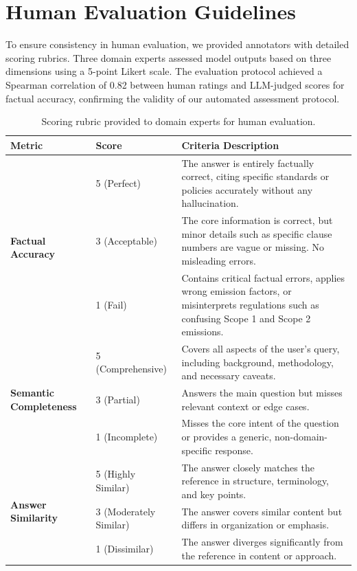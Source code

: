 \documentclass[]{interact}
\theoremstyle{plain}%
\theoremstyle{definition}
\theoremstyle{remark}
\begin{document}
\section{Human Evaluation Guidelines}\label{secA5}

To ensure consistency in human evaluation, we provided annotators with detailed scoring rubrics. Three domain experts assessed model outputs based on three dimensions using a 5-point Likert scale. The evaluation protocol achieved a Spearman correlation of 0.82 between human ratings and LLM-judged scores for factual accuracy, confirming the validity of our automated assessment protocol.

\begin{table}[h]
\centering
\caption{Scoring rubric provided to domain experts for human evaluation.}
\small
\begin{tabularx}{\linewidth}{l l >{\raggedright\arraybackslash}X}
\toprule
\textbf{Metric} & \textbf{Score} & \textbf{Criteria Description} \\
\midrule
\multirow{3}{*}{\textbf{Factual Accuracy}} 
& 5 (Perfect) & The answer is entirely factually correct, citing specific standards or policies accurately without any hallucination. \\
& 3 (Acceptable) & The core information is correct, but minor details such as specific clause numbers are vague or missing. No misleading errors. \\
& 1 (Fail) & Contains critical factual errors, applies wrong emission factors, or misinterprets regulations such as confusing Scope 1 and Scope 2 emissions. \\
\midrule
\multirow{3}{*}{\textbf{Semantic Completeness}} 
& 5 (Comprehensive) & Covers all aspects of the user's query, including background, methodology, and necessary caveats. \\
& 3 (Partial) & Answers the main question but misses relevant context or edge cases. \\
& 1 (Incomplete) & Misses the core intent of the question or provides a generic, non-domain-specific response. \\
\midrule
\multirow{3}{*}{\textbf{Answer Similarity}} 
& 5 (Highly Similar) & The answer closely matches the reference in structure, terminology, and key points. \\
& 3 (Moderately Similar) & The answer covers similar content but differs in organization or emphasis. \\
& 1 (Dissimilar) & The answer diverges significantly from the reference in content or approach. \\
\bottomrule
\end{tabularx}
\end{table}
\end{document}
